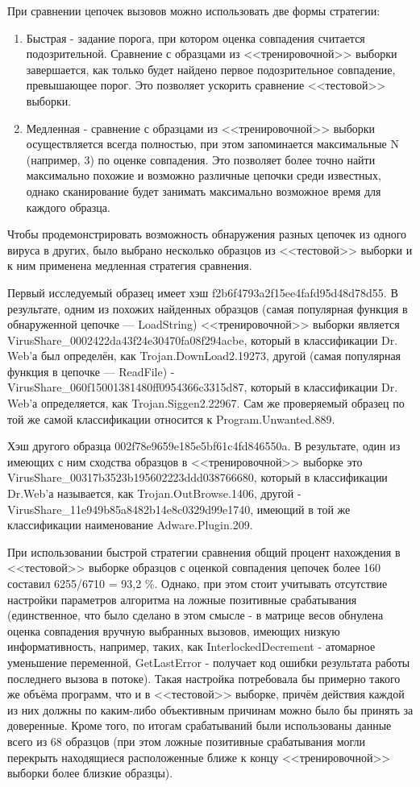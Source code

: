 При сравнении цепочек вызовов можно использовать две формы стратегии:
\begin {enumerate}
	\item Быстрая - задание порога, при котором оценка совпадения считается подозрительной. Сравнение с образцами из <<тренировочной>> выборки завершается, как только будет найдено первое подозрительное совпадение, превышающее порог. Это позволяет ускорить сравнение <<тестовой>> выборки. 
	\item Медленная - сравнение с образцами из <<тренировочной>> выборки осуществляется всегда полностью, при этом запоминается максимальные N (например, 3) по оценке совпадения. Это позволяет более точно найти максимально похожие и возможно различные цепочки среди известных, однако сканирование будет занимать максимально возможное время для каждого образца.
\end {enumerate}

Чтобы продемонстрировать возможность обнаружения разных цепочек из одного вируса в других, было выбрано несколько образцов из <<тестовой>> выборки и к ним применена медленная стратегия сравнения.

Первый исследуемый образец имеет хэш f2b6f4793a2f15ee4fafd95d48d78d55. В результате, одним из похожих найденных образцов (самая популярная функция в обнаруженной цепочке --- LoadString) <<тренировочной>> выборки является VirusShare\_0002422da43f24e30470fa08f294acbe, который в классификации Dr. Web'а был определён, как Trojan.DownLoad2.19273, другой (самая популярная функция в цепочке --- ReadFile) - VirusShare\_060f15001381480ff0954366c3315d87, который в  классификации Dr. Web'а определяется, как Trojan.Siggen2.22967. Сам же проверяемый образец по той же самой классификации относится к Program.Unwanted.889.

Хэш другого образца 002f78e9659e185e5bf61c4fd846550a. В результате, один из имеющих с ним сходства образцов в <<тренировочной>> выборке это VirusShare\_00317b3523b195602223ddd038766680, который в классификации Dr.Web'а называется, как Trojan.OutBrowse.1406, другой - VirusShare\_11e949b85a8482b14e8c0329d99e1740, имеющий в той же классификации наименование Adware.Plugin.209.

При использовании быстрой стратегии сравнения общий процент нахождения в <<тестовой>> выборке образцов с оценкой совпадения цепочек более 160 составил 6255/6710 = 93,2 \%. Однако, при этом стоит учитывать отсутствие настройки параметров алгоритма на ложные позитивные срабатывания (единственное, что было сделано в этом смысле - в матрице весов обнулена оценка совпадения вручную выбранных вызовов, имеющих низкую информативность,  например, таких, как InterlockedDecrement - атомарное уменьшение переменной, GetLastError - получает код ошибки результата работы последнего вызова в потоке). Такая настройка потребовала бы примерно такого же объёма программ, что и в <<тестовой>> выборке, причём действия каждой из них должны по каким-либо объективным причинам можно было бы принять за доверенные. Кроме того, по итогам срабатываний были использованы данные всего из 68 образцов (при этом ложные позитивные срабатывания могли перекрыть находящиеся расположенные ближе к концу <<тренировочной>> выборки более близкие образцы).

